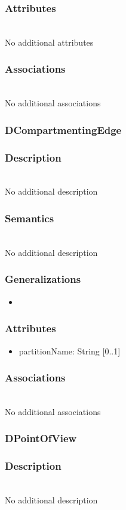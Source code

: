 \documentclass{article}
\begin{document}
\subsubsection*{Attributes} ~\\ No additional attributes
\subsubsection*{Associations} ~\\ No additional associations
\subsubsection{DCompartmentingEdge}\label{DCompartmentingEdge} 
\subsubsection*{Description} ~\\ No additional description
\subsubsection*{Semantics} ~\\ No additional description
\subsubsection*{Generalizations}
\begin{itemize}
\item {}
\end{itemize}
\subsubsection*{Attributes}
\begin{itemize}
\item partitionName: String [0..1] 
\end{itemize}
\subsubsection*{Associations} ~\\ No additional associations
\subsubsection{DPointOfView}\label{DPointOfView} 
\subsubsection*{Description} ~\\ No additional description
\end{document}
